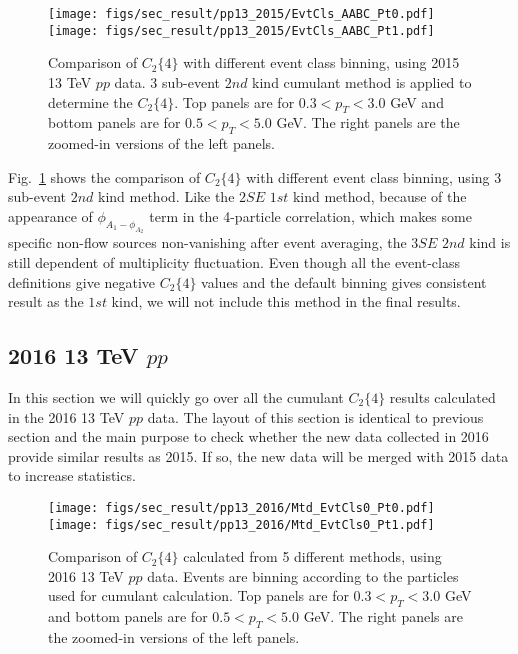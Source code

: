 \begin{figure}[H]
\centering
\texttt{[image: figs/sec\_result/pp13\_2015/EvtCls\_AABC\_Pt0.pdf]}
\texttt{[image: figs/sec\_result/pp13\_2015/EvtCls\_AABC\_Pt1.pdf]}
\caption{Comparison of $C_{2}\{4\}$ with different event class binning, using 2015 13 TeV $pp$ data. 3 sub-event $2nd$ kind cumulant method is applied to determine the $C_{2}\{4\}$. Top panels are for $0.3<p_{T}<3.0$ GeV and bottom panels are for $0.5<p_{T}<5.0$ GeV. The right panels are the zoomed-in versions of the left panels.}
\label{fig:result_pp13_2015_EvtCls_AABC}
\end{figure}

Fig.~\ref{fig:result_pp13_2015_EvtCls_AABC} shows the comparison of $C_{2}\{4\}$ with different event class binning, using 3 sub-event $2nd$ kind method. Like the $2SE$ $1st$ kind method, because of the appearance of $\phi_{A_{1}-\phi_{A_{2}}}$ term in the 4-particle correlation, which makes some specific non-flow sources non-vanishing after event averaging, the $3SE$ $2nd$ kind is still dependent of multiplicity fluctuation. Even though all the event-class definitions give negative $C_{2}\{4\}$ values and the default binning gives consistent result as the $1st$ kind, we will not include this method in the final results.


\subsection{2016 13 TeV $pp$}
In this section we will quickly go over all the cumulant $C_{2}\{4\}$ results calculated in the 2016 13 TeV $pp$ data. The layout of this section is identical to previous section and the main purpose to check whether the new data collected in 2016 provide similar results as 2015. If so, the new data will be merged with 2015 data to increase statistics.

\begin{figure}[H]
\centering
\texttt{[image: figs/sec\_result/pp13\_2016/Mtd\_EvtCls0\_Pt0.pdf]}
\texttt{[image: figs/sec\_result/pp13\_2016/Mtd\_EvtCls0\_Pt1.pdf]}
\caption{Comparison of $C_{2}\{4\}$ calculated from 5 different methods, using 2016 13 TeV $pp$ data. Events are binning according to the particles used for cumulant calculation. Top panels are for $0.3<p_{T}<3.0$ GeV and bottom panels are for $0.5<p_{T}<5.0$ GeV. The right panels are the zoomed-in versions of the left panels.}
\label{fig:result_pp13_2016_Mtd_EvtCls0}
\end{figure}

